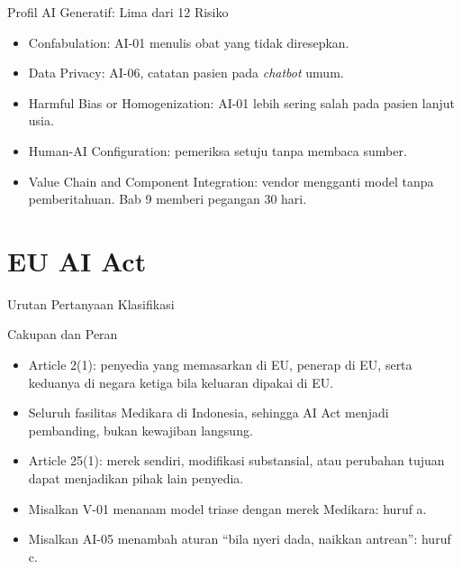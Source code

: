 \documentclass[aspectratio=169, table, 12pt]{beamer}
\begin{document}
\begin{frame}{{\Large Profil AI Generatif: Lima dari 12 Risiko}}
  \vspace{6pt}
  \small
  \begin{itemize}
    \item Confabulation: AI-01 menulis obat yang tidak diresepkan.
    \item Data Privacy: AI-06, catatan pasien pada \textit{chatbot} umum.
    \item Harmful Bias or Homogenization: AI-01 lebih sering salah pada pasien lanjut usia.
    \item Human-AI Configuration: pemeriksa setuju tanpa membaca sumber.
    \item Value Chain and Component Integration: vendor mengganti model tanpa pemberitahuan. Bab 9
          memberi pegangan 30 hari.
  \end{itemize}
\end{frame}

\section{EU AI Act}

\begin{frame}{{\Large Urutan Pertanyaan Klasifikasi}}
  \vspace{-2pt}
  \begin{center}
    \resizebox{!}{0.77\textheight}{}
  \end{center}
\end{frame}

\begin{frame}{{\Large Cakupan dan Peran}}
  \vspace{6pt}
  \small
  \begin{itemize}
    \item Article 2(1): penyedia yang memasarkan di EU, penerap di EU, serta keduanya di negara
          ketiga bila keluaran dipakai di EU.
    \item Seluruh fasilitas Medikara di Indonesia, sehingga AI Act menjadi pembanding, bukan
          kewajiban langsung.
    \item Article 25(1): merek sendiri, modifikasi substansial, atau perubahan tujuan dapat
          menjadikan pihak lain penyedia.
    \item Misalkan V-01 menanam model triase dengan merek Medikara: huruf a.
    \item Misalkan AI-05 menambah aturan ``bila nyeri dada, naikkan antrean'': huruf c.
  \end{itemize}
\end{frame}
\end{document}
